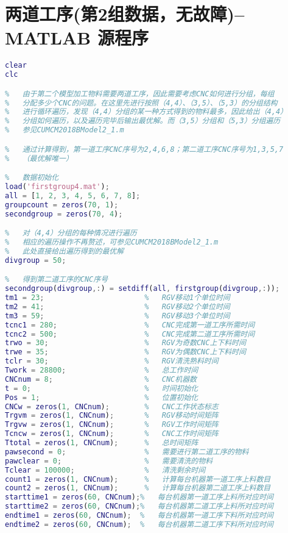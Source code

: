 \documentclass[no-math,withoutpreface,bwprint]{cumcmthesis} %
\numberwithin{equation}{section}
\numberwithin{figure}{section}
\numberwithin{table}{section}
\begin{document}
\section{ 两道工序(第2组数据，无故障)--MATLAB 源程序}
\begin{lstlisting}[language=matlab]
%   MATLAB初始化
clear
clc

%   由于第二个模型加工物料需要两道工序，因此需要考虑CNC如何进行分组，每组
%   分配多少个CNC的问题。在这里先进行按照（4,4）、（3,5）、（5,3）的分组结构
%   进行循环遍历，发现（4,4）分组的某一种方式得到的物料最多，因此给出（4,4）
%   分组如何遍历，以及遍历完毕后输出最优解。而（3,5）分组和（5,3）分组遍历
%   参见CUMCM2018BModel2_1.m

%   通过计算得到，第一道工序CNC序号为2,4,6,8；第二道工序CNC序号为1,3,5,7
%   （最优解唯一）

%   数据初始化
load('firstgroup4.mat');
all = [1, 2, 3, 4, 5, 6, 7, 8];
groupcount = zeros(70, 1);
secondgroup = zeros(70, 4);

%   对（4,4）分组的每种情况进行遍历
%   相应的遍历操作不再赘述，可参见CUMCM2018BModel2_1.m
%   此处直接给出遍历得到的最优解
divgroup = 50;

%   得到第二道工序的CNC序号
secondgroup(divgroup,:) = setdiff(all, firstgroup(divgroup,:));
tm1 = 23;                       %   RGV移动1个单位时间
tm2 = 41;                       %   RGV移动2个单位时间
tm3 = 59;                       %   RGV移动3个单位时间
tcnc1 = 280;                    %   CNC完成第一道工序所需时间
tcnc2 = 500;                    %   CNC完成第二道工序所需时间
trwo = 30;                      %   RGV为奇数CNC上下料时间
trwe = 35;                      %   RGV为偶数CNC上下料时间
tclr = 30;                      %   RGV清洗熟料时间
Twork = 28800;                  %   总工作时间
CNCnum = 8;                     %   CNC机器数
t = 0;                          %   时间初始化
Pos = 1;                        %   位置初始化
CNCw = zeros(1, CNCnum);        %   CNC工作状态标志
Trgvm = zeros(1, CNCnum);      	%   RGV移动时间矩阵
Trgvw = zeros(1, CNCnum);       %   RGV工作时间矩阵
Tcncw = zeros(1, CNCnum);       %   CNC工作时间矩阵
Ttotal = zeros(1, CNCnum);      %   总时间矩阵
pawsecond = 0;                  %   需要进行第二道工序的物料
pawclear = 0;                   %   需要清洗的物料
Tclear = 100000;                %   清洗剩余时间
count1 = zeros(1, CNCnum);      %   计算每台机器第一道工序上料数目
count2 = zeros(1, CNCnum);      %   计算每台机器第二道工序上料数目
starttime1 = zeros(60, CNCnum);%   每台机器第一道工序上料所对应时间
starttime2 = zeros(60, CNCnum);%   每台机器第二道工序上料所对应时间
endtime1 = zeros(60, CNCnum);  %   每台机器第一道工序下料所对应时间
endtime2 = zeros(60, CNCnum);  %   每台机器第二道工序下料所对应时间


\end{lstlisting}
\end{document}
